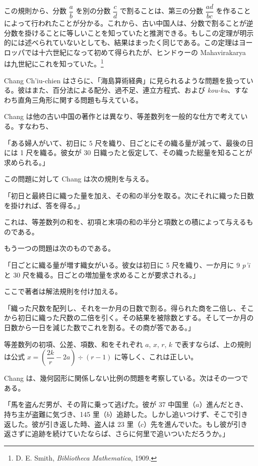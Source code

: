 \documentclass[11pt]{article}
\newcommand{\scanpage}[2]{\clearpage\setcounter{footnote}{0}\noindent{\footnotesize\color{gray}PDF #1 頁 · #2}\par\medskip}
\newcommand{\scanfooter}{}
\begin{document}
この規則から、分数 $\dfrac{a}{b}$ を別の分数 $\dfrac{c}{d}$ で割ることは、第三の分数 $\dfrac{ad}{bc}$ を作ることによって行われたことが分かる。これから、古い中国人は、分数で割ることが逆分数を掛けることに等しいことを知っていたと推測できる。もしこの定理が明示的には述べられていないとしても、結果はまったく同じである。この定理はヨーロッパでは十六世紀になって初めて得られたが、ヒンドゥーの Mahavirakarya は九世紀にこれを知っていた。\footnote{D. E. Smith, \emph{Bibliotheca Mathematica}, 1909.}

Chang Ch'iu-chien はさらに、「海島算術経典」に見られるような問題を扱っている。彼はまた、百分法による配分、過不足、連立方程式、および \emph{kou-ku}、すなわち直角三角形に関する問題も与えている。

Chang は他の古い中国の著作とは異なり、等差数列を一般的な仕方で考えている。すなわち、
\scanfooter

\scanpage{0055}{第六章、印刷頁41}

「ある婦人がいて、初日に 5 尺を織り、日ごとにその織る量が減って、最後の日には 1 尺を織る。彼女が 30 日織ったと仮定して、その織った総量を知ることが求められる。」

この問題に対して Chang は次の規則を与える。

「初日と最終日に織った量を加え、その和の半分を取る。次にそれに織った日数を掛ければ、答を得る。」

これは、等差数列の和を、初項と末項の和の半分と項数との積によって与えるものである。

もう一つの問題は次のものである。

「日ごとに織る量が増す織女がいる。彼女は初日に 5 尺を織り、一か月に 9 \emph{p'i} と 30 尺を織る。日ごとの増加量を求めることが要求される。」

ここで著者は解法規則を付け加える。

「織った尺数を配列し、それを一か月の日数で割る。得られた商を二倍し、そこから初日に織った尺数の二倍を引く。その結果を被除数とする。そして一か月の日数から一日を減じた数でこれを割る。その商が答である。」

等差数列の初項、公差、項数、和をそれぞれ $a$, $x$, $r$, $k$ で表すならば、上の規則は公式 $x=\left(\dfrac{2k}{r}-2a\right)\div(r-1)$ に等しく、これは正しい。

Chang は、幾何図形に関係しない比例の問題を考察している。次はその一つである。

「馬を盗んだ男が、その背に乗って逃げた。彼が 37 中国里（$a$）進んだとき、持ち主が盗難に気づき、145 里（$b$）追跡した。しかし追いつけず、そこで引き返した。彼が引き返した時、盗人は 23 里（$c$）先を進んでいた。もし彼が引き返さずに追跡を続けていたならば、さらに何里で追いついただろうか。」
\end{document}
